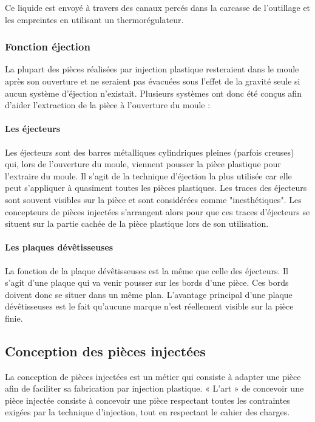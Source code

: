 \documentclass[11pt,oneside]{article}
\begin{document}
        
        Ce liquide est envoyé à travers des canaux percés dans la carcasse de
l'outillage et les 
empreintes en utilisant un thermorégulateur. 

        \subsubsection{Fonction éjection}

        La plupart des pièces réalisées par injection plastique resteraient dans
le moule après 
son ouverture et ne seraient pas évacuées sous l'effet de la gravité seule si
aucun système 
d'éjection n'existait. 
        Plusieurs  systèmes  ont  donc  été  conçus  afin  d'aider  l'extraction
 de  la  pièce  à 
l'ouverture du moule : 
         \paragraph{Les éjecteurs}
         Les  éjecteurs  sont  des  barres  métalliques  cylindriques  pleines 
(parfois  creuses)  qui, 
lors de l'ouverture du moule, viennent pousser la pièce plastique pour
l'extraire du moule. Il 
s'agit de la technique d'éjection la plus utilisée car elle peut s'appliquer à
quasiment toutes 
les  pièces  plastiques.  Les  traces  des  éjecteurs  sont  souvent  visibles 
sur  la  pièce  et  sont 
considérées  comme  "inesthétiques".  Les  concepteurs  de  pièces  injectées 
s'arrangent  alors 
pour que ces traces d'éjecteurs se situent sur la partie cachée de la pièce
plastique lors de 
son utilisation. 
         \paragraph{Les plaques dévêtisseuses}

         La fonction de la plaque dévêtisseuses est la même que celle des
éjecteurs. Il s'agit 
d'une plaque qui va venir pousser sur les bords d'une pièce. Ces bords doivent
donc se situer 
dans  un  même  plan.  L'avantage  principal  d'une  plaque  dévêtisseuses  est 
le  fait  qu'aucune 
marque n'est réellement visible sur la pièce finie. 
         \subsection{Conception des pièces injectées}
         La conception de pièces injectées est un métier qui consiste à adapter
une pièce afin 
de  faciliter  sa  fabrication  par  injection  plastique.  « L'art »  de 
concevoir  une  pièce  injectée 
consiste  à  concevoir  une  pièce  respectant  toutes  les  contraintes 
exigées  par  la  technique 
d'injection, tout en respectant le cahier des charges. 
\end{document}
